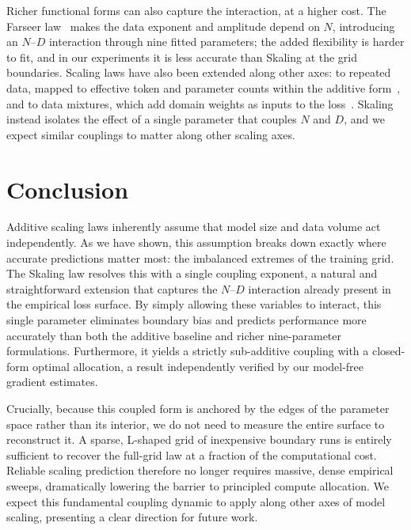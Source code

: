 \documentclass[]{fairmeta}
\newcommand{\ska}{Skaling}
\begin{document}
Richer functional forms can also capture the interaction, at a higher cost. The Farseer law~\citep{li2025predictable} makes the data exponent and amplitude depend on $N$, introducing an $N$--$D$ interaction through nine fitted parameters; the added flexibility is harder to fit, and in our experiments it is less accurate than \ska{} at the grid boundaries. Scaling laws have also been extended along other axes: to repeated data, mapped to effective token and parameter counts within the additive form~\citep{muennighoff2023scaling}, and to data mixtures, which add domain weights as inputs to the loss~\citep{ye2024datamixing,shukor2026scaling}. \ska{} instead isolates the effect of a single parameter that couples $N$ and $D$, and we expect similar couplings to matter along other scaling axes.

\section{Conclusion}\label{sec:conclusion}

Additive scaling laws inherently assume that model size and data volume act independently. As we have shown, this assumption breaks down exactly where accurate predictions matter most: the imbalanced extremes of the training grid. The \ska{} law resolves this with a single coupling exponent, a natural and straightforward extension that captures the $N$--$D$ interaction already present in the empirical loss surface. By simply allowing these variables to interact, this single parameter eliminates boundary bias and predicts performance more accurately than both the additive baseline and richer nine-parameter formulations. Furthermore, it yields a strictly sub-additive coupling with a closed-form optimal allocation, a result independently verified by our model-free gradient estimates.

Crucially, because this coupled form is anchored by the edges of the parameter space rather than its interior, we do not need to measure the entire surface to reconstruct it. A sparse, L-shaped grid of inexpensive boundary runs is entirely sufficient to recover the full-grid law at a fraction of the computational cost. Reliable scaling prediction therefore no longer requires massive, dense empirical sweeps, dramatically lowering the barrier to principled compute allocation. We expect this fundamental coupling dynamic to apply along other axes of model scaling, presenting a clear direction for future work.



\end{document}
